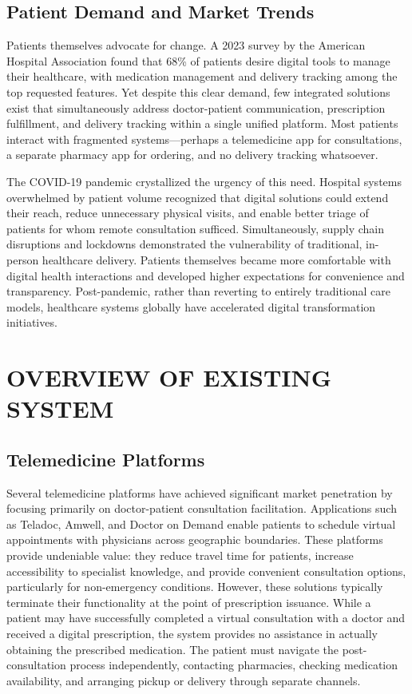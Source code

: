 \documentclass[12pt,a4paper]{report}
\begin{document}
\subsection{Patient Demand and Market Trends}

Patients themselves advocate for change. A 2023 survey by the American Hospital Association found that 68\% of patients desire digital tools to manage their healthcare, with medication management and delivery tracking among the top requested features. Yet despite this clear demand, few integrated solutions exist that simultaneously address doctor-patient communication, prescription fulfillment, and delivery tracking within a single unified platform. Most patients interact with fragmented systems---perhaps a telemedicine app for consultations, a separate pharmacy app for ordering, and no delivery tracking whatsoever.

The COVID-19 pandemic crystallized the urgency of this need. Hospital systems overwhelmed by patient volume recognized that digital solutions could extend their reach, reduce unnecessary physical visits, and enable better triage of patients for whom remote consultation sufficed. Simultaneously, supply chain disruptions and lockdowns demonstrated the vulnerability of traditional, in-person healthcare delivery. Patients themselves became more comfortable with digital health interactions and developed higher expectations for convenience and transparency. Post-pandemic, rather than reverting to entirely traditional care models, healthcare systems globally have accelerated digital transformation initiatives.

\section{OVERVIEW OF EXISTING SYSTEM}

\subsection{Telemedicine Platforms}

Several telemedicine platforms have achieved significant market penetration by focusing primarily on doctor-patient consultation facilitation. Applications such as Teladoc, Amwell, and Doctor on Demand enable patients to schedule virtual appointments with physicians across geographic boundaries. These platforms provide undeniable value: they reduce travel time for patients, increase accessibility to specialist knowledge, and provide convenient consultation options, particularly for non-emergency conditions. However, these solutions typically terminate their functionality at the point of prescription issuance. While a patient may have successfully completed a virtual consultation with a doctor and received a digital prescription, the system provides no assistance in actually obtaining the prescribed medication. The patient must navigate the post-consultation process independently, contacting pharmacies, checking medication availability, and arranging pickup or delivery through separate channels.
\end{document}
